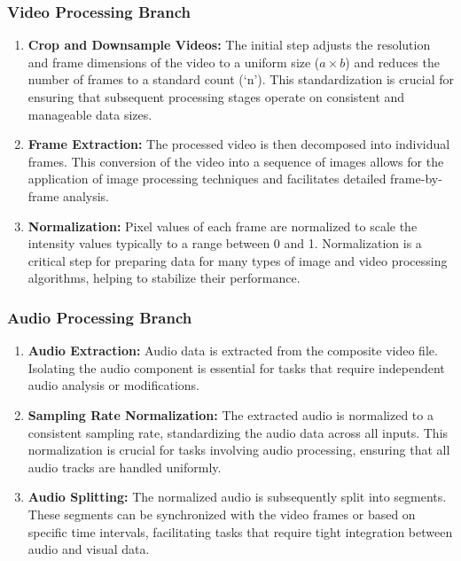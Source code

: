 \documentclass{ioereport}
\begin{document}
    \subsubsection{Video Processing Branch}
    \begin{enumerate}[label=\textbf{\roman*.}]
        \item \textbf{Crop and Downsample Videos:}
        The initial step adjusts the resolution and frame dimensions of the video to a uniform size (\(a \times b\)) and reduces the number of frames to a standard count (`n'). This standardization is crucial for ensuring that subsequent processing stages operate on consistent and manageable data sizes.
        
        \item \textbf{Frame Extraction:}
        The processed video is then decomposed into individual frames. This conversion of the video into a sequence of images allows for the application of image processing techniques and facilitates detailed frame-by-frame analysis.
        
        \item \textbf{Normalization:}
        Pixel values of each frame are normalized to scale the intensity values typically to a range between 0 and 1. Normalization is a critical step for preparing data for many types of image and video processing algorithms, helping to stabilize their performance.
    \end{enumerate}
    
    \subsubsection{Audio Processing Branch}
    
    \begin{enumerate}[label=\textbf{\roman*.}]
        \item \textbf{Audio Extraction:}
        Audio data is extracted from the composite video file. Isolating the audio component is essential for tasks that require independent audio analysis or modifications.
        
        \item \textbf{Sampling Rate Normalization:}
        The extracted audio is normalized to a consistent sampling rate, standardizing the audio data across all inputs. This normalization is crucial for tasks involving audio processing, ensuring that all audio tracks are handled uniformly.
        
        \item \textbf{Audio Splitting:}
        The normalized audio is subsequently split into segments. These segments can be synchronized with the video frames or based on specific time intervals, facilitating tasks that require tight integration between audio and visual data.
    \end{enumerate}
    
\end{document}
